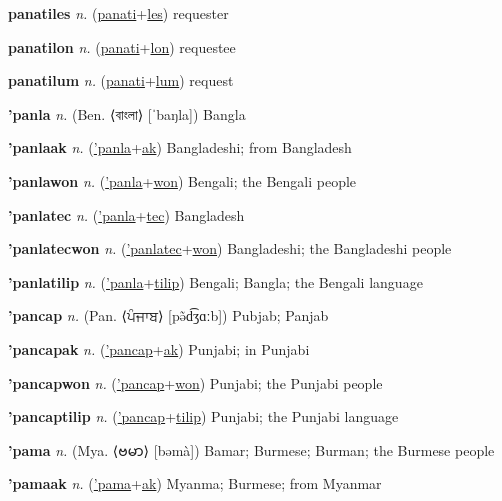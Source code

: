 \textbf{\hypertarget{panatiles}{panatiles}} \textit{n.} (\hyperlink{panati}{panati}+\allowbreak \hyperlink{les}{les})
requester

\textbf{\hypertarget{panatilon}{panatilon}} \textit{n.} (\hyperlink{panati}{panati}+\allowbreak \hyperlink{lon}{lon})
requestee

\textbf{\hypertarget{panatilum}{panatilum}} \textit{n.} (\hyperlink{panati}{panati}+\allowbreak \hyperlink{lum}{lum})
request

\textbf{\hypertarget{'panla}{'panla}} \textit{n.} (Ben. ⟨{\bengali{}বাংলা}⟩ [ˈbaŋla])
Bangla

\textbf{\hypertarget{'panlaak}{'panlaak}} \textit{n.} (\hyperlink{'panla}{'panla}+\allowbreak \hyperlink{ak}{ak})
Bangladeshi; from Bangladesh

\textbf{\hypertarget{'panlawon}{'panlawon}} \textit{n.} (\hyperlink{'panla}{'panla}+\allowbreak \hyperlink{won}{won})
Bengali; the Bengali people

\textbf{\hypertarget{'panlatec}{'panlatec}} \textit{n.} (\hyperlink{'panla}{'panla}+\allowbreak \hyperlink{tec}{tec})
Bangladesh

\textbf{\hypertarget{'panlatecwon}{'panlatecwon}} \textit{n.} (\hyperlink{'panlatec}{'panlatec}+\allowbreak \hyperlink{won}{won})
Bangladeshi; the Bangladeshi people

\textbf{\hypertarget{'panlatilip}{'panlatilip}} \textit{n.} (\hyperlink{'panla}{'panla}+\allowbreak \hyperlink{tilip}{tilip})
Bengali; Bangla; the Bengali language

\textbf{\hypertarget{'pancap}{'pancap}} \textit{n.} (Pan. ⟨{\gurmukhi{}ਪੰਜਾਬ}⟩ [pə̃d͡ʒɑːb])
Pubjab; Panjab

\textbf{\hypertarget{'pancapak}{'pancapak}} \textit{n.} (\hyperlink{'pancap}{'pancap}+\allowbreak \hyperlink{ak}{ak})
Punjabi; in Punjabi

\textbf{\hypertarget{'pancapwon}{'pancapwon}} \textit{n.} (\hyperlink{'pancap}{'pancap}+\allowbreak \hyperlink{won}{won})
Punjabi; the Punjabi people

\textbf{\hypertarget{'pancaptilip}{'pancaptilip}} \textit{n.} (\hyperlink{'pancap}{'pancap}+\allowbreak \hyperlink{tilip}{tilip})
Punjabi; the Punjabi language

\textbf{\hypertarget{'pama}{'pama}} \textit{n.} (Mya. ⟨{\myanmar{}ဗမာ}⟩ [bəmà])
Bamar; Burmese; Burman; the Burmese people

\textbf{\hypertarget{'pamaak}{'pamaak}} \textit{n.} (\hyperlink{'pama}{'pama}+\allowbreak \hyperlink{ak}{ak})
Myanma; Burmese; from Myanmar

